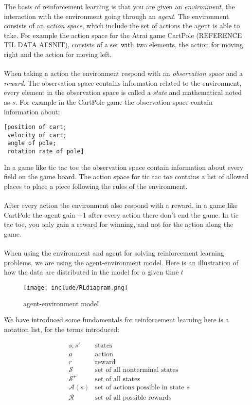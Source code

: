\documentclass[11pt]{article}
\begin{document}
The basis of reinforcement learning is that you are given an \textit{environment}, the interaction with the environment going through an \textit{agent}. The environment consists of an \textit{action space}, which include the set of actions the agent is able to take. For example the action space for the Atrai game CartPole (REFERENCE TIL DATA AFSNIT), consists of a set with two elements, the action for moving right and the action for moving left.
\\ \\
When taking a action the environment respond with an \textit{observation space} and a \textit{reward}. The observation space contains information related to the environment, every element in the observation space is called a \textit{state} and mathematical noted as $s$. For example in the CartPole game the observation space contain information about:
\begin{verbatim}
[position of cart; 
 velocity of cart; 
 angle of pole; 
 rotation rate of pole]
\end{verbatim}
In a game like tic tac toe the observation space contain information about every field on the game board. The action space for tic tac toe contains a list of allowed places to place a piece following the rules of the environment.
\\ \\
After every action the environment also respond with a reward, in a game like CartPole the agent gain +1 after every action there don't end the game. In tic tac toe, you only gain a reward for winning, and not for the action along the game.
\\ \\
When using the environment and agent for solving reinforcement learning problems, we are using the agent-environment model. Here is an illustration of how the data are distributed in the model for a given time $t$
\begin{figure}[!h]
    \centering
    \texttt{[image: include/RLdiagram.png]}
    \caption{agent-environment model}
    \label{fig:agent_enviroment}
\end{figure}
We have introduced some fundamentals for reinforcement learning here is a notation list, for the terms introduced:
\begin{tcolorbox}
\begin{align*}
& s, s'  & \text{states} \\
& a & \text{action} \\
& r & \text{reward} \\
& \mathcal{S} & \text{set of all nonterminal states} \\
& \mathcal{S}^{+} & \text{set of all states} \\
& \mathcal{A}(s) & \text{set of actions possible in state } s \\
& \mathcal{R} & \text{set of all possible rewards} \\
\end{align*}
\end{tcolorbox}
\end{document}

